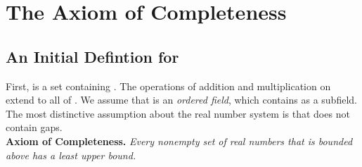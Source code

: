 \section{The Axiom of Completeness}
\subsection{An Initial Defintion for \R}
First, \R is a set containing \Q. The operations of addition and multiplication on \Q extend to all of \R. We assume that \R is an \textit{ordered field}, which contains \Q as a subfield. \\
The most distinctive assumption about the real number system is that \R does not contain gaps. \\
\textbf{Axiom of Completeness. }\textit{Every nonempty set of real numbers that is bounded above has a least upper bound.} \\
